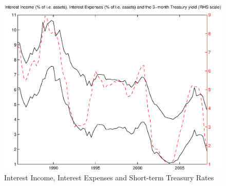 \documentclass[12pt]{article}
\begin{document}
\begin{figure}[tbp]
\caption{Interest Income, Interest Expenses and Short-term Treasury Rates} \label{figure_nims_components}
\center
\includegraphics[scale=0.85]{figure_nims_components.ps}
\end{figure}
\end{document}
